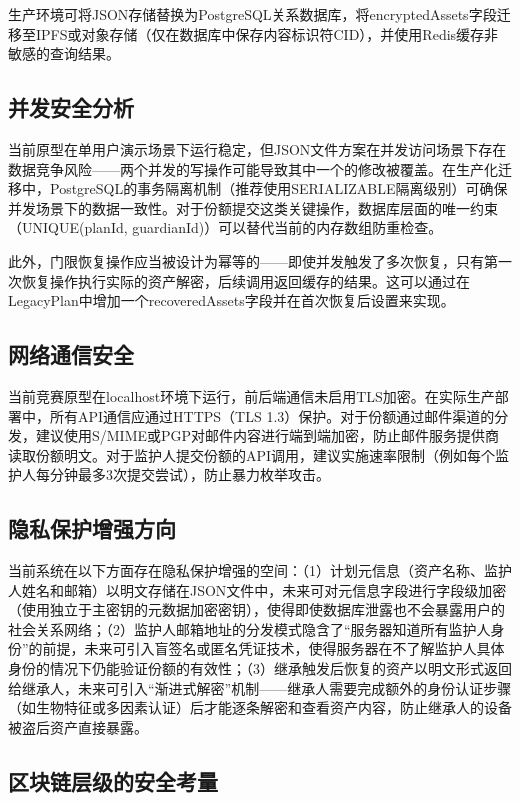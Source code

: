 \documentclass[UTF8,a4paper,zihao=-4,openany]{ctexrep}
\begin{document}
生产环境可将JSON存储替换为PostgreSQL关系数据库，将encryptedAssets字段迁移至IPFS或对象存储（仅在数据库中保存内容标识符CID），并使用Redis缓存非敏感的查询结果。

\subsection{并发安全分析}

当前原型在单用户演示场景下运行稳定，但JSON文件方案在并发访问场景下存在数据竞争风险——两个并发的写操作可能导致其中一个的修改被覆盖。在生产化迁移中，PostgreSQL的事务隔离机制（推荐使用SERIALIZABLE隔离级别）可确保并发场景下的数据一致性。对于份额提交这类关键操作，数据库层面的唯一约束（UNIQUE(planId, guardianId)）可以替代当前的内存数组防重检查。

此外，门限恢复操作应当被设计为幂等的——即使并发触发了多次恢复，只有第一次恢复操作执行实际的资产解密，后续调用返回缓存的结果。这可以通过在LegacyPlan中增加一个recoveredAssets字段并在首次恢复后设置来实现。

\subsection{网络通信安全}

当前竞赛原型在localhost环境下运行，前后端通信未启用TLS加密。在实际生产部署中，所有API通信应通过HTTPS（TLS 1.3）保护。对于份额通过邮件渠道的分发，建议使用S/MIME或PGP对邮件内容进行端到端加密，防止邮件服务提供商读取份额明文。对于监护人提交份额的API调用，建议实施速率限制（例如每个监护人每分钟最多3次提交尝试），防止暴力枚举攻击。

\subsection{隐私保护增强方向}

当前系统在以下方面存在隐私保护增强的空间：（1）计划元信息（资产名称、监护人姓名和邮箱）以明文存储在JSON文件中，未来可对元信息字段进行字段级加密（使用独立于主密钥的元数据加密密钥），使得即使数据库泄露也不会暴露用户的社会关系网络；（2）监护人邮箱地址的分发模式隐含了“服务器知道所有监护人身份”的前提，未来可引入盲签名或匿名凭证技术，使得服务器在不了解监护人具体身份的情况下仍能验证份额的有效性；（3）继承触发后恢复的资产以明文形式返回给继承人，未来可引入“渐进式解密”机制——继承人需要完成额外的身份认证步骤（如生物特征或多因素认证）后才能逐条解密和查看资产内容，防止继承人的设备被盗后资产直接暴露。

\subsection{区块链层级的安全考量}
\end{document}
